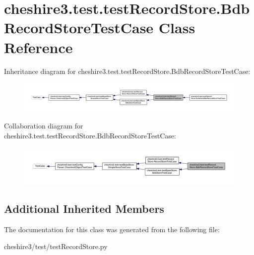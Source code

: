 \hypertarget{classcheshire3_1_1test_1_1test_record_store_1_1_bdb_record_store_test_case}{\section{cheshire3.\-test.\-test\-Record\-Store.\-Bdb\-Record\-Store\-Test\-Case Class Reference}
\label{classcheshire3_1_1test_1_1test_record_store_1_1_bdb_record_store_test_case}
}


Inheritance diagram for cheshire3.\-test.\-test\-Record\-Store.\-Bdb\-Record\-Store\-Test\-Case\-:
\nopagebreak
\begin{figure}[H]
\begin{center}
\leavevmode
\includegraphics[width=350pt]{classcheshire3_1_1test_1_1test_record_store_1_1_bdb_record_store_test_case__inherit__graph}
\end{center}
\end{figure}


Collaboration diagram for cheshire3.\-test.\-test\-Record\-Store.\-Bdb\-Record\-Store\-Test\-Case\-:
\nopagebreak
\begin{figure}[H]
\begin{center}
\leavevmode
\includegraphics[width=350pt]{classcheshire3_1_1test_1_1test_record_store_1_1_bdb_record_store_test_case__coll__graph}
\end{center}
\end{figure}
\subsection*{Additional Inherited Members}


The documentation for this class was generated from the following file\-:\begin{DoxyCompactItemize}
\item 
cheshire3/test/test\-Record\-Store.\-py\end{DoxyCompactItemize}
